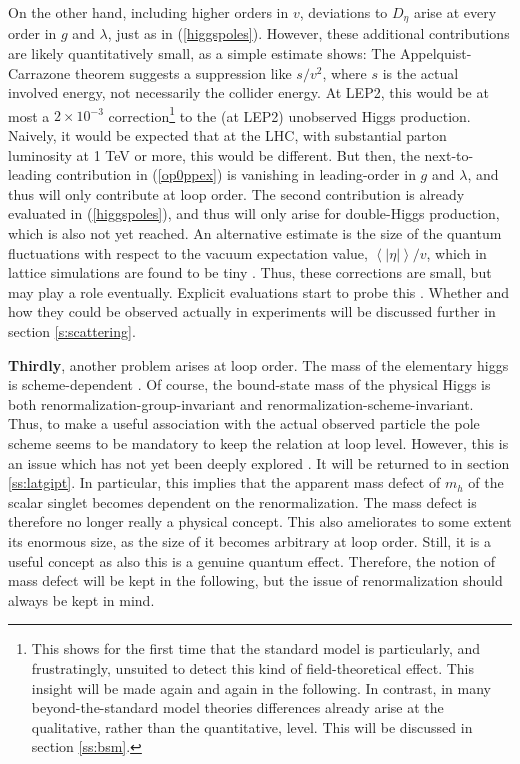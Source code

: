 \documentclass[final,twoside,12pt]{article}
\newcommand*{\pref}[1]{(\ref{#1})}
\newcommand*{\1}{1\!\!\!\bot}
\newcommand*{\la}{\left\langle}
\newcommand*{\ra}{\right\rangle}
\begin{document}
On the other hand, including higher orders in $v$, deviations to $D_\eta$ arise at every order in $g$ and $\lambda$, just as in \pref{higgspoles}. However, these additional contributions are likely quantitatively small, as a simple estimate shows: The Appelquist-Carrazone theorem suggests a suppression like $s/v^2$, where $s$ is the actual involved energy, not necessarily the collider energy. At LEP2, this would be at most a $2\times 10^{-3}$ correction\footnote{This shows for the first time that the standard model is particularly, and frustratingly, unsuited to detect this kind of field-theoretical effect. This insight will be made again and again in the following. In contrast, in many beyond-the-standard model theories differences already arise at the qualitative, rather than the quantitative, level. This will be discussed in section \ref{ss:bsm}.} to the (at LEP2) unobserved Higgs production. Naively, it would be expected that at the LHC, with substantial parton luminosity at 1 TeV or more, this would be different. But then, the next-to-leading contribution in \pref{op0ppex} is vanishing in leading-order in $g$ and $\lambda$, and thus will only contribute at loop order. The second contribution is already evaluated in \pref{higgspoles}, and thus will only arise for double-Higgs production, which is also not yet reached. An alternative estimate is the size of the quantum fluctuations with respect to the vacuum expectation value, $\la|\eta|\ra/v$, which in lattice simulations are found to be tiny \cite{Maas:2012ct}. Thus, these corrections are small, but may play a role eventually. Explicit evaluations start to probe this \cite{Maas:unpublished,Raubitzek:unpublished}. Whether and how they could be observed actually in experiments will be discussed further in section \ref{s:scattering}.

{\bf Thirdly}, another problem arises at loop order. The mass of the elementary higgs is scheme-dependent \cite{Bohm:2001yx,Einhorn:1992um}. Of course, the bound-state mass of the physical Higgs is both renormalization-group-invariant and renormalization-scheme-invariant. Thus, to make a useful association with the actual observed particle the pole scheme \cite{Bohm:2001yx,Einhorn:1992um} seems to be mandatory to keep the relation at loop level. However, this is an issue which has not yet been deeply explored \cite{Maas:2013aia}. It will be returned to in section \ref{ss:latgipt}. In particular, this implies that the apparent mass defect of $m_h$ of the scalar singlet becomes dependent on the renormalization. The mass defect is therefore no longer really a physical concept. This also ameliorates to some extent its enormous size, as the size of it becomes arbitrary at loop order. Still, it is a useful concept as also this is a genuine quantum effect. Therefore, the notion of mass defect will be kept in the following, but the issue of renormalization should always be kept in mind.
\end{document}
